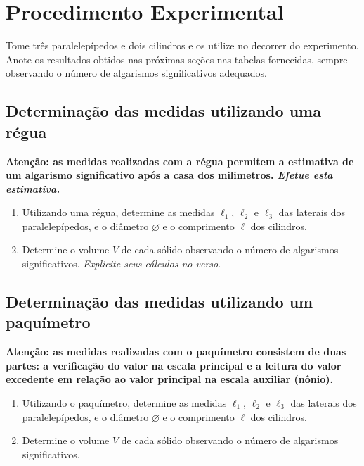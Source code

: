 \section{Procedimento Experimental}

Tome três paralelepípedos e dois cilindros e os utilize no decorrer do experimento. Anote os resultados obtidos nas próximas seções nas tabelas fornecidas, sempre observando o número de algarismos significativos adequados.

\subsection{Determinação das medidas utilizando uma régua}

\textbf{Atenção: as medidas realizadas com a régua permitem a estimativa de um algarismo significativo após a casa dos milimetros. \emph{Efetue esta estimativa.}}

\begin{enumerate}
\item Utilizando uma régua, determine as medidas $\ell_1$, $\ell_2$ e $\ell_3$ das laterais dos paralelepípedos, e o diâmetro $\diameter$ e o comprimento $\ell$ dos cilindros. 
\item Determine o volume $V$ de cada sólido observando o número de algarismos significativos. \emph{Explicite seus cálculos no verso}.
\end{enumerate}

\subsection{Determinação das medidas utilizando um paquímetro}

\textbf{Atenção: as medidas realizadas com o paquímetro consistem de duas partes: a verificação do valor na escala principal e a leitura do valor excedente em relação ao valor principal na escala auxiliar (nônio).}

\begin{enumerate}
\item Utilizando o paquímetro, determine as medidas $\ell_1$, $\ell_2$ e $\ell_3$ das laterais dos paralelepípedos, e o diâmetro $\diameter$ e o comprimento $\ell$ dos cilindros.
\item Determine o volume $V$ de cada sólido observando o número de algarismos significativos.
\end{enumerate}


